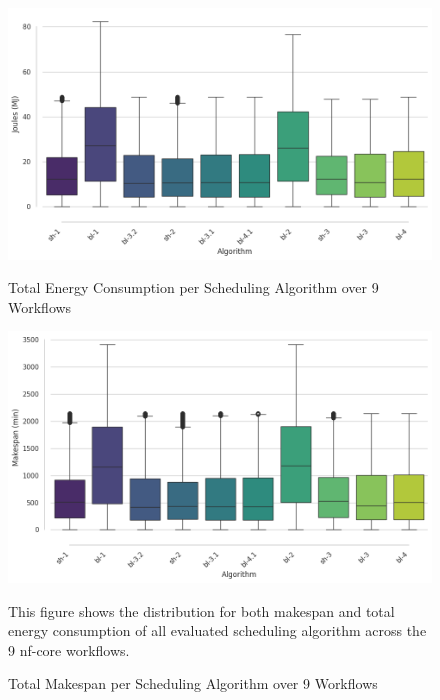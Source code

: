 \begin{figure}[H]
    \centering
    \includegraphics[scale=0.5]{fig/06/06-boxplot-energy.png}
    \small \caption{Total Energy Consumption per Scheduling Algorithm over 9 Workflows}
    \tiny
    \includegraphics[scale=0.5]{fig/06/06-boxplot-runtime.png}
    \small \caption{Total Makespan per Scheduling Algorithm over 9 Workflows}
    \label{fig:boxplot_runtime}
    \tiny
    This figure shows the distribution for both makespan and total energy consumption of all evaluated scheduling algorithm across the 9 nf-core workflows.
\end{figure}

